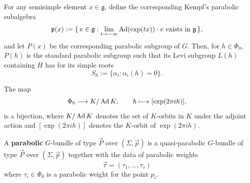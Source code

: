 \documentclass[12pt]{article}
\begin{document}
For any semisimple element \(x\in \mathfrak g\), define the corresponding Kempf's parabolic subalgebra
\[
\mathfrak p(x):=\{\, v\in \mathfrak g : \lim_{t\to -\infty} \operatorname{Ad}(\exp(tx))\cdot v \ \text{exists in } \mathfrak g \,\},
\]
and let \(P(x)\) be the corresponding parabolic subgroup of \(G\). Then, for \(h\in \Phi_0\), \(P(h)\) is the standard parabolic subgroup such that its Levi subgroup \(L(h)\) containing \(H\) has for its simple roots
\[
S_h:=\{\alpha_i : \alpha_i(h)=0\}.
\]
\begin{lemma}
The map
\[
\Phi_0 \longrightarrow K/\operatorname{Ad} K,\qquad
h \longmapsto [\exp(2\pi i h)],
\]
is a bijection, where \(K/\operatorname{Ad} K\) denotes the set of \(K\)-orbits in \(K\) under the adjoint action and \([\exp(2\pi i h)]\) denotes the \(K\)-orbit of \(\exp(2\pi i h)\).
\end{lemma}

\begin{definition}
    A \textbf{parabolic} $G$-bundle of type $\vec P$ over $(\Sigma,\vec p)$ is a quasi-parabolic $G$-bundle of type $\vec P$ over $(\Sigma,\vec p)$ together with the data of parabolic weights \[\vec \tau = (\tau_1,\dots,\tau_s)\] where $\tau_i \in \Phi_0$ is a parabolic weight for the point $p_i$.
\end{definition}
\end{document}
